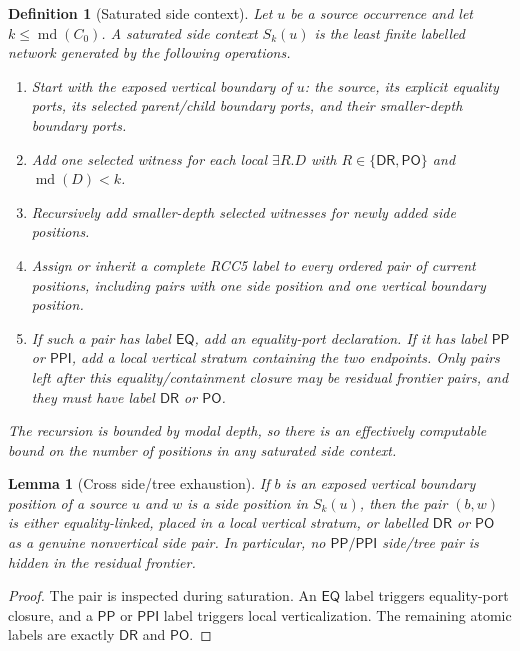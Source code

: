 \documentclass[11pt]{article}
\newtheorem{lemma}[theorem]{Lemma}
\newtheorem{definition}[theorem]{Definition}
\newcommand{\md}{\operatorname{md}}
\newcommand{\EQ}{\mathsf{EQ}}
\newcommand{\PP}{\mathsf{PP}}
\newcommand{\PPI}{\mathsf{PPI}}
\newcommand{\PO}{\mathsf{PO}}
\newcommand{\DR}{\mathsf{DR}}
\begin{document}
\begin{definition}[Saturated side context]
Let \(u\) be a source occurrence and let \(k\le \md(C_0)\).  A saturated side context \(S_k(u)\) is the least finite labelled network generated by the following operations.
\begin{enumerate}[label=(Sat\arabic*)]
\item Start with the exposed vertical boundary of \(u\): the source, its explicit equality ports, its selected parent/child boundary ports, and their smaller-depth boundary ports.
\item Add one selected witness for each local \(\exists R.D\) with \(R\in\{\DR,\PO\}\) and \(\md(D)<k\).
\item Recursively add smaller-depth selected witnesses for newly added side positions.
\item Assign or inherit a complete RCC5 label to every ordered pair of current positions, including pairs with one side position and one vertical boundary position.
\item If such a pair has label \(\EQ\), add an equality-port declaration.  If it has label \(\PP\) or \(\PPI\), add a local vertical stratum containing the two endpoints.  Only pairs left after this equality/containment closure may be residual frontier pairs, and they must have label \(\DR\) or \(\PO\).
\end{enumerate}
The recursion is bounded by modal depth, so there is an effectively computable bound on the number of positions in any saturated side context.
\end{definition}

\begin{lemma}[Cross side/tree exhaustion]\label{lem:cross-side-tree-compact}
If \(b\) is an exposed vertical boundary position of a source \(u\) and \(w\) is a side position in \(S_k(u)\), then the pair \((b,w)\) is either equality-linked, placed in a local vertical stratum, or labelled \(\DR\) or \(\PO\) as a genuine nonvertical side pair.  In particular, no \(\PP/\PPI\) side/tree pair is hidden in the residual frontier.
\end{lemma}

\begin{proof}
The pair is inspected during saturation.  An \(\EQ\) label triggers equality-port closure, and a \(\PP\) or \(\PPI\) label triggers local verticalization.  The remaining atomic labels are exactly \(\DR\) and \(\PO\).
\end{proof}
\end{document}
